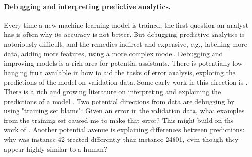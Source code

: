 \documentclass[sigplan,preprint,10pt]{acmart}\settopmatter{printfolios=true,printccs=false,printacmref=false}
\theoremstyle{plain}
\theoremstyle{definition}
\begin{document}
{{\paragraph{Debugging and interpreting predictive analytics.}
Every time a new machine learning model is trained,
the first question an analyst has is often
why its accuracy is not better. But
debugging predictive analytics is notoriously difficult, and the remedies indirect and expensive,
 e.g., labelling more data, adding more features,
 using a more complex model. Debugging and improving
 models is a rich area for potential assistants.
 There is potentially low hanging fruit available
 in how to aid the tasks of
error analysis, exploring the
predictions of the model
on validation data. Some early work in this direction is
\cite{saleema}.
There is a rich and growing literature on
interpreting and explaining the predictions
of a model \cite{lipton:mythos,doshi-velez17,ribiero2016lime,darksight}.
Two potential directions from data are
debugging by using
"training set blame": Given an error in the validation data, what examples from the training set caused me to make that error? This might build on the work of \cite{percy}.
Another potential avenue is explaining
differences between predictions: why was instance 42 treated differently than instance 24601, even though they appear highly similar to a human?
}

}
\end{document}
